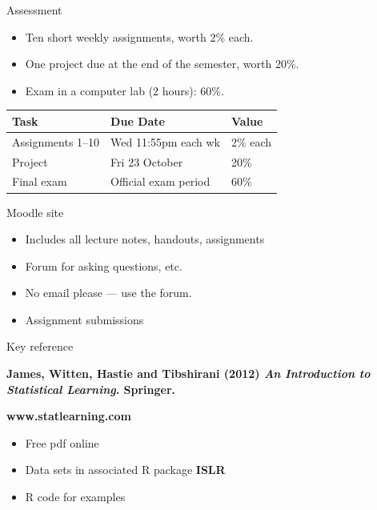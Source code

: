 \documentclass[14pt]{beamer}
\begin{document}
\begin{frame}{Assessment}

\begin{itemize}
\item
Ten short weekly assignments, worth 2\% each.
\item One project due at the end of the semester, worth 20\%.
\item Exam in a computer lab (2 hours): 60\%.
\end{itemize}

\begin{block}{}{\tabcolsep=0.1cm\begin{tabular}{lll}
  \textbf{Task}     & \textbf{Due Date}     & \textbf{Value} \\ \midrule
  Assignments 1--10 & Wed 11:55pm each wk & 2\% each\\
  Project           & Fri 23 October        & 20\%           \\
  Final exam        & Official exam period  & 60\%          
\end{tabular}}
\end{block}

\end{frame}


\begin{frame}{Moodle site}

\begin{itemize}
\item Includes all lecture notes, handouts, assignments
\item Forum for asking questions, etc.
\item No email please --- use the forum.
\item Assignment submissions
\end{itemize}

\end{frame}

\begin{frame}{Key reference}\large

\begin{block}{}\bf
{James, Witten, Hastie and Tibshirani (2012) \emph{An Introduction to Statistical Learning}. Springer.}
\end{block}
\begin{alertblock}{}\Large
\centerline{\bf www.statlearning.com}
\end{alertblock}

\begin{itemize}
\item Free pdf online
\item Data sets in associated R package \textbf{ISLR}
\item R code for examples
\end{itemize}
\end{frame}
\end{document}
